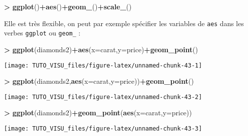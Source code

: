 \documentclass[]{book}
\newenvironment{Shaded}{\begin{snugshade}}{\end{snugshade}}
\newcommand{\DataTypeTok}[1]{\textcolor[rgb]{0.13,0.29,0.53}{#1}}
\newcommand{\KeywordTok}[1]{\textcolor[rgb]{0.13,0.29,0.53}{\textbf{#1}}}
\newcommand{\NormalTok}[1]{#1}
\newcommand{\OperatorTok}[1]{\textcolor[rgb]{0.81,0.36,0.00}{\textbf{#1}}}
\newcommand{\StringTok}[1]{\textcolor[rgb]{0.31,0.60,0.02}{#1}}
\theoremstyle{definition}
\theoremstyle{definition}
\theoremstyle{definition}
\theoremstyle{remark}
\begin{document}
\begin{Shaded}
\begin{Highlighting}[]
\OperatorTok{>}\StringTok{ }\KeywordTok{ggplot}\NormalTok{()}\OperatorTok{+}\KeywordTok{aes}\NormalTok{()}\OperatorTok{+}\KeywordTok{geom_}\NormalTok{()}\OperatorTok{+}\KeywordTok{scale_}\NormalTok{()}
\end{Highlighting}
\end{Shaded}

Elle est très flexible, on peut par exemple spécifier les variables de \texttt{aes} dans les verbes \texttt{ggplot} ou \texttt{geom\_} :

\begin{Shaded}
\begin{Highlighting}[]
\OperatorTok{>}\StringTok{ }\KeywordTok{ggplot}\NormalTok{(diamonds2)}\OperatorTok{+}\KeywordTok{aes}\NormalTok{(}\DataTypeTok{x=}\NormalTok{carat,}\DataTypeTok{y=}\NormalTok{price)}\OperatorTok{+}\KeywordTok{geom_point}\NormalTok{()}
\end{Highlighting}
\end{Shaded}

\begin{center}\texttt{[image: TUTO\_VISU\_files/figure-latex/unnamed-chunk-43-1]} \end{center}

\begin{Shaded}
\begin{Highlighting}[]
\OperatorTok{>}\StringTok{ }\KeywordTok{ggplot}\NormalTok{(diamonds2,}\KeywordTok{aes}\NormalTok{(}\DataTypeTok{x=}\NormalTok{carat,}\DataTypeTok{y=}\NormalTok{price))}\OperatorTok{+}\KeywordTok{geom_point}\NormalTok{()}
\end{Highlighting}
\end{Shaded}

\begin{center}\texttt{[image: TUTO\_VISU\_files/figure-latex/unnamed-chunk-43-2]} \end{center}

\begin{Shaded}
\begin{Highlighting}[]
\OperatorTok{>}\StringTok{ }\KeywordTok{ggplot}\NormalTok{(diamonds2)}\OperatorTok{+}\KeywordTok{geom_point}\NormalTok{(}\KeywordTok{aes}\NormalTok{(}\DataTypeTok{x=}\NormalTok{carat,}\DataTypeTok{y=}\NormalTok{price))}
\end{Highlighting}
\end{Shaded}

\begin{center}\texttt{[image: TUTO\_VISU\_files/figure-latex/unnamed-chunk-43-3]} \end{center}
\end{document}
